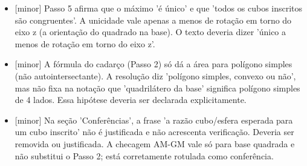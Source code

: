 \documentclass{article}%
\begin{document}
\begin{itemize}%
\item%
{[}minor{]} Passo 5 afirma que o máximo 'é único' e que 'todos os cubos inscritos são congruentes'. A unicidade vale apenas a menos de rotação em torno do eixo z (a orientação do quadrado na base). O texto deveria dizer 'único a menos de rotação em torno do eixo z'.%
\item%
{[}minor{]} A fórmula do cadarço (Passo 2) só dá a área para polígono simples (não autointersectante). A resolução diz 'polígono simples, convexo ou não', mas não fixa na notação que 'quadrilátero da base' significa polígono simples de 4 lados. Essa hipótese deveria ser declarada explicitamente.%
\item%
{[}minor{]} Na seção 'Conferências', a frase 'a razão cubo/esfera esperada para um cubo inscrito' não é justificada e não acrescenta verificação. Deveria ser removida ou justificada. A checagem AM{-}GM vale só para base quadrada e não substitui o Passo 2; está corretamente rotulada como conferência.%
\end{itemize}%
\end{document}
